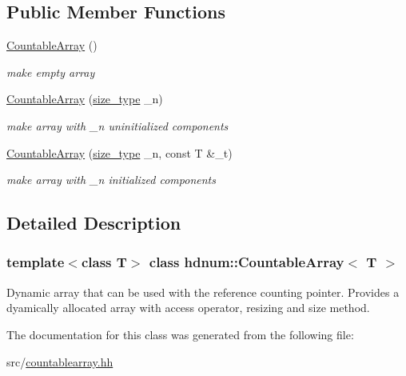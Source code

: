 \subsection*{Public Member Functions}
\begin{DoxyCompactItemize}
\item 
\hypertarget{classhdnum_1_1CountableArray_afb98f6c0294a385f78f34d77b172de58}{
\hyperlink{classhdnum_1_1CountableArray_afb98f6c0294a385f78f34d77b172de58}{CountableArray} ()}
\label{classhdnum_1_1CountableArray_afb98f6c0294a385f78f34d77b172de58}

\begin{DoxyCompactList}\small\item\em make empty array \item\end{DoxyCompactList}\item 
\hypertarget{classhdnum_1_1CountableArray_a4e0bc82910abedec2a59fb7c2dabf7f3}{
\hyperlink{classhdnum_1_1CountableArray_a4e0bc82910abedec2a59fb7c2dabf7f3}{CountableArray} (\hyperlink{classhdnum_1_1CountableArray_a8505dbe8243864d347eb74d46d5c4fb7}{size\_\-type} \_\-n)}
\label{classhdnum_1_1CountableArray_a4e0bc82910abedec2a59fb7c2dabf7f3}

\begin{DoxyCompactList}\small\item\em make array with \_\-n uninitialized components \item\end{DoxyCompactList}\item 
\hypertarget{classhdnum_1_1CountableArray_a19cb42db927a26a18c19600f7b1b9bc1}{
\hyperlink{classhdnum_1_1CountableArray_a19cb42db927a26a18c19600f7b1b9bc1}{CountableArray} (\hyperlink{classhdnum_1_1CountableArray_a8505dbe8243864d347eb74d46d5c4fb7}{size\_\-type} \_\-n, const T \&\_\-t)}
\label{classhdnum_1_1CountableArray_a19cb42db927a26a18c19600f7b1b9bc1}

\begin{DoxyCompactList}\small\item\em make array with \_\-n initialized components \item\end{DoxyCompactList}\end{DoxyCompactItemize}


\subsection{Detailed Description}
\subsubsection*{template$<$class T$>$ class hdnum::CountableArray$<$ T $>$}

Dynamic array that can be used with the reference counting pointer. Provides a dyamically allocated array with access operator, resizing and size method. 

The documentation for this class was generated from the following file:\begin{DoxyCompactItemize}
\item 
src/\hyperlink{countablearray_8hh}{countablearray.hh}\end{DoxyCompactItemize}
